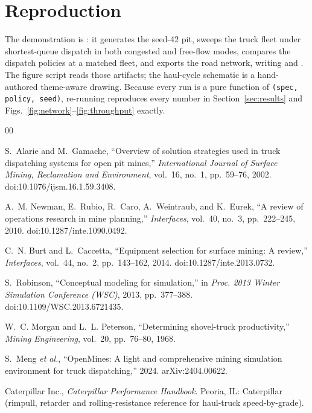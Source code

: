 \documentclass[journal]{IEEEtran}
\begin{document}
\appendices
\section{Reproduction}\label{app:repro}

{\raggedright
The demonstration is : it generates the seed-42 pit,
sweeps the truck fleet under shortest-queue dispatch in both congested and free-flow modes, compares the dispatch
policies at a matched fleet, and exports the road network, writing  and
. The figure script reads those artifacts; the haul-cycle schematic is a hand-authored
theme-aware drawing. Because every run is a pure function of \texttt{(spec, policy, seed)}, re-running reproduces
every number in Section~\ref{sec:results} and Figs.~\ref{fig:network}--\ref{fig:throughput} exactly.\par}

\balance

\begin{thebibliography}{00}

 S.~Alarie and M.~Gamache, ``Overview of solution strategies used in truck dispatching systems
for open pit mines,'' \emph{International Journal of Surface Mining, Reclamation and Environment}, vol.~16,
no.~1, pp.~59--76, 2002. doi:10.1076/ijsm.16.1.59.3408.

 A.~M. Newman, E.~Rubio, R.~Caro, A.~Weintraub, and K.~Eurek, ``A review of operations research
in mine planning,'' \emph{Interfaces}, vol.~40, no.~3, pp.~222--245, 2010. doi:10.1287/inte.1090.0492.

 C.~N. Burt and L.~Caccetta, ``Equipment selection for surface mining: A review,''
\emph{Interfaces}, vol.~44, no.~2, pp.~143--162, 2014. doi:10.1287/inte.2013.0732.

 S.~Robinson, ``Conceptual modeling for simulation,'' in \emph{Proc. 2013 Winter Simulation
Conference (WSC)}, 2013, pp.~377--388. doi:10.1109/WSC.2013.6721435.

 W.~C. Morgan and L.~L. Peterson, ``Determining shovel-truck productivity,'' \emph{Mining
Engineering}, vol.~20, pp.~76--80, 1968.

 S.~Meng \emph{et al.}, ``OpenMines: A light and comprehensive mining simulation environment
for truck dispatching,'' 2024. arXiv:2404.00622.

 Caterpillar Inc., \emph{Caterpillar Performance Handbook}. Peoria, IL: Caterpillar (rimpull,
retarder and rolling-resistance reference for haul-truck speed-by-grade).

\end{thebibliography}
\end{document}
